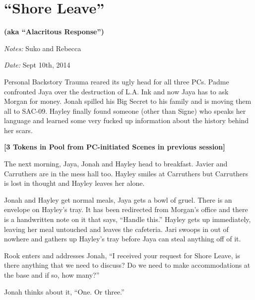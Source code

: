 \setcounter{chapter}{ 31 }
\chapter{\textbf{``Shore Leave''} }




\begin{center}
 {\LARGE \textbf{(aka ``Alacritous Response'')} } 
\end{center}




\textit{Notes:} Suko and Rebecca

\textit{Date:} Sept 10th, 2014



Personal Backstory Trauma reared its ugly head for all three PCs.  Padme confronted Jaya over the destruction of L.A. Ink and now Jaya has to ask Morgan for money.  Jonah spilled his Big Secret to his family and is moving them all to SAC-09.  Hayley finally found someone (other than Signe) who speaks her language and learned some very fucked up information about the history behind her scars. 





\noindent\hrulefill





\textbf{{[}3 Tokens in Pool from PC-initiated Scenes in previous session{]}}



The next morning, Jaya, Jonah and Hayley head to breakfast.  Javier and Carruthers are in the mess hall too.  Hayley smiles at Carruthers but Carruthers is lost in thought and Hayley leaves her alone.



Jonah and Hayley get normal meals, Jaya gets a bowl of gruel.  There is an envelope on Hayley's tray.  It has been redirected from Morgan's office and there is a handwritten note on it that says, ``Handle this.''  Hayley gets up immediately, leaving her meal untouched and leaves the cafeteria.  Jari swoops in out of nowhere and gathers up Hayley's tray before Jaya can steal anything off of it.



Rook enters and addresses Jonah, ``I received your request for Shore Leave, is there anything that we need to discuss?  Do we need to make accommodations at the base and if so, how many?''

Jonah thinks about it, ``One.  Or three.''

